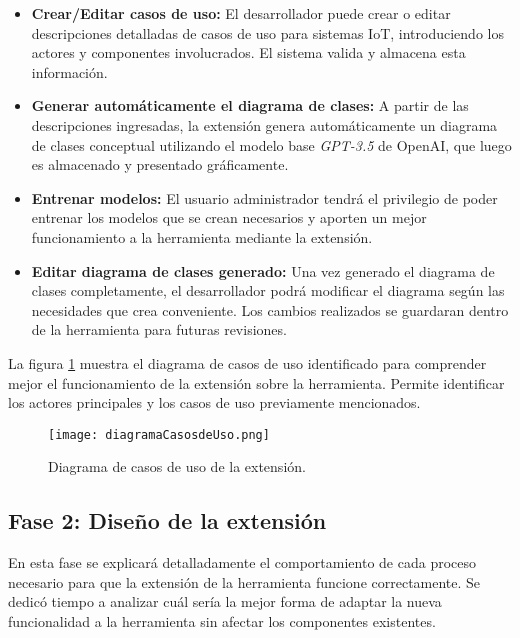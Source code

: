 \begin{itemize}
	\item \textbf{Crear/Editar casos de uso:} El desarrollador puede crear o editar descripciones detalladas de casos de uso para sistemas IoT, introduciendo los actores y componentes involucrados. El sistema valida y almacena esta información.
	
	\item \textbf{Generar automáticamente el diagrama de clases:} A partir de las descripciones ingresadas, la extensión genera automáticamente un diagrama de clases conceptual utilizando el modelo base \textit{GPT-3.5} de OpenAI, que luego es almacenado y presentado gráficamente.
	
	\item \textbf{Entrenar modelos:} El usuario administrador tendrá el privilegio de poder entrenar los modelos que se crean necesarios y aporten un mejor funcionamiento a la herramienta mediante la extensión. 
	
	\item \textbf{Editar diagrama de clases generado:} Una vez generado el diagrama de clases completamente, el desarrollador podrá modificar el diagrama según las necesidades que crea conveniente. Los cambios realizados se guardaran dentro de la herramienta para futuras revisiones. 
\end{itemize}

La figura \ref{fig:cap3_diagramacasodeuso} muestra el diagrama de casos de uso identificado para comprender mejor el funcionamiento de la extensión sobre la herramienta. Permite identificar los actores principales y los casos de uso previamente mencionados. 

\begin{figure}[H]  
	\centering
	\texttt{[image: diagramaCasosdeUso.png]}
	\caption{Diagrama de casos de uso de la extensión.}
	\label{fig:cap3_diagramacasodeuso}
\end{figure}

\subsection{Fase 2: Diseño de la extensión}

En esta fase se explicará detalladamente el comportamiento de cada proceso necesario para que la extensión de la herramienta funcione correctamente. Se dedicó tiempo a analizar cuál sería la mejor forma de adaptar la nueva funcionalidad a la herramienta sin afectar los componentes existentes.

